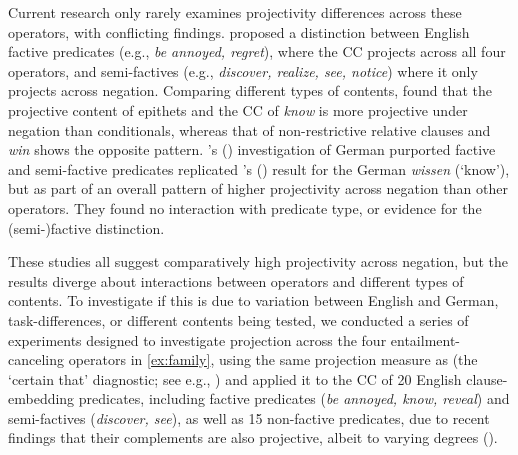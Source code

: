 \documentclass[12pt, a4paper]{article}
\newcommand{\posscite}[1]{\citeauthor{#1}'s (\citeyear{#1})}
\begin{document}
	\vspace{-.5\baselineskip}
	\noindent  Current research only rarely examines projectivity differences across these operators, with conflicting findings.
	\citet{karttunen_observations_1971} proposed a distinction between English factive predicates (e.g., \emph{be annoyed, regret}), where the CC projects across all four operators, and semi-factives (e.g., \emph{discover, realize, see, notice}) where it only projects across negation.
	Comparing different types of contents, \citet{smith_relationship_2014} found that the projective content of epithets and the CC of \emph{know} is more projective under negation than conditionals,
	whereas that of non-restrictive relative clauses and \emph{win} shows the opposite pattern.
	\posscite{sieker_projective_2022} investigation of German purported factive and semi-factive predicates replicated \posscite{smith_relationship_2014} result for the German \emph{wissen} (`know'), but as part of an overall pattern of higher projectivity across negation than other operators. They found no interaction with predicate type, or evidence for the (semi-)factive distinction.
	
	These studies all suggest comparatively high projectivity across negation, but the results diverge about interactions between operators and different types of contents. To investigate if this is due to variation between English and German, task-differences, or different contents being tested, we conducted a series of experiments designed to investigate projection across the four entailment-canceling operators in \ref{ex:family}, using the same projection measure as \citet{sieker_projective_2022} (the `certain that' diagnostic; see e.g., \citealp{tonhauser_how_2018,djarv_prosodic_2017,mahler_social_2020}) and applied it to the CC of 20 English clause-embedding predicates, including factive predicates (\emph{be annoyed, know, reveal}) and semi-factives (\emph{discover, see}),
	as well as 15 non-factive predicates, due to recent findings that their complements are also projective, albeit to varying degrees (\citealt{degen_are_2022}).
\end{document}
